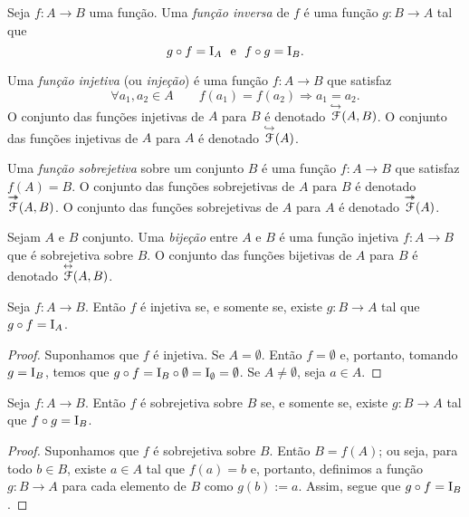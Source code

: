 \begin{definition}
Seja $f\colon A \to B$ uma função. Uma \emph{função inversa} de $f$ é uma função $g\colon B \to A$ tal que
	\begin{equation*}
	g \circ f = \mathrm{I}_A \text{\ \ e\ \ } f \circ g = \mathrm{I}_B.
	\end{equation*}
\end{definition}

\begin{definition}
Uma \emph{função injetiva} (ou \emph{injeção}) é uma função $f\colon A \to B$ que satisfaz
	\begin{equation*}
	\forall a_1,a_2 \in A \qquad f(a_1)=f(a_2) \Rightarrow a_1=a_2.
	\end{equation*}
O conjunto das funções injetivas de $A$ para $B$ é denotado $\overset{\hookrightarrow}{\mathcal{F}}(A,B)$. O conjunto das funções injetivas de $A$ para $A$ é denotado $\overset{\hookrightarrow}{\mathcal{F}}(A)$.
\end{definition}

\begin{definition}
Uma \emph{função sobrejetiva} sobre um conjunto $B$ é uma função $f\colon A \to B$ que satisfaz $f(A)=B$. O conjunto das funções sobrejetivas de $A$ para $B$ é denotado $\Epi{\Func}(A,B)$. O conjunto das funções sobrejetivas de $A$ para $A$ é denotado $\Epi{\Func}(A)$.
\end{definition}

\begin{definition}
Sejam $A$ e $B$ conjunto. Uma \emph{bijeção} entre $A$ e $B$ é uma função injetiva $f\colon A \to B$ que é sobrejetiva sobre $B$. O conjunto das funções bijetivas de $A$ para $B$ é denotado $\overset{\leftrightarrow}{\mathcal{F}}(A,B)$.
\end{definition}

\begin{proposition}
\label{prop:func.inv.esq}
Seja $f\colon A \to B$. Então $f$ é injetiva se, e somente se, existe $g\colon B \to A$ tal que $g \circ f = \mathrm{I}_A$.
\end{proposition}
\begin{proof}
Suponhamos que $f$ é injetiva. Se $A = \emptyset$. Então $f=\emptyset$ e, portanto, tomando $g=\mathrm{I}_B$, temos que $g \circ f = \mathrm{I}_B \circ \emptyset = \mathrm{I}_\emptyset = \emptyset$.
	Se $A \neq \emptyset$, seja $a \in A$.
	
	
\end{proof}

\begin{proposition}
\label{prop:func.inv.dir}
Seja $f\colon A \to B$. Então $f$ é sobrejetiva sobre $B$ se, e somente se, existe $g\colon B \to A$ tal que $f \circ g = \mathrm{I}_B$.
\end{proposition}
\begin{proof}
Suponhamos que $f$ é sobrejetiva sobre $B$. Então $B=f(A)$; ou seja, para todo $b \in B$, existe $a \in A$ tal que $f(a)=b$ e, portanto, definimos a função $g\colon B \to A$ para cada elemento de $B$ como $g(b) := a$. Assim, segue que $g \circ f = \mathrm{I}_B$.
\end{proof}

